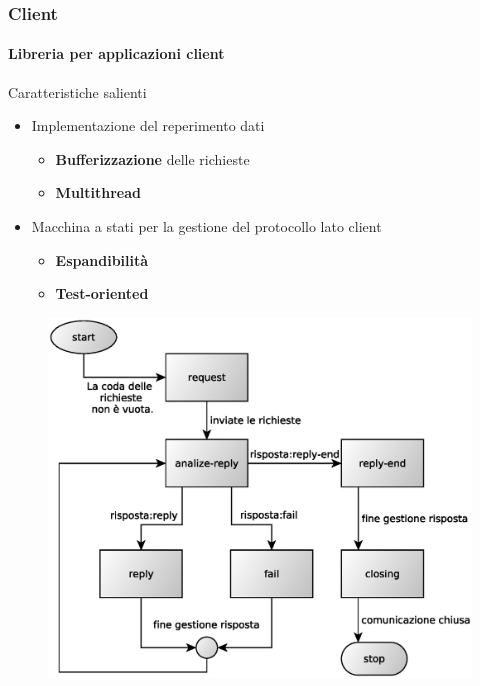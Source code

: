\documentclass[ignorenonframetext,8pt]{beamer}
\begin{document}
	\begin{frame}
		\frametitle{Client}
		\framesubtitle{Libreria per applicazioni client}
		\begin{block}{Caratteristiche salienti}
			\begin{minipage}[c]{.40\textwidth}
				\begin{itemize}
					\item Implementazione del reperimento dati
						\begin{itemize}
							\item \textbf{Bufferizzazione} delle richieste
							\item \textbf{Multithread}
						\end{itemize}
					\item Macchina a stati per la gestione del protocollo lato client
						\begin{itemize}
							\item \textbf{Espandibilit\`a}
							\item \textbf{Test-oriented}
						\end{itemize}
				\end{itemize}
			\end{minipage}
			\begin{minipage}[c]{.59\textwidth}
				\begin{figure}
					\includegraphics[width=\textwidth]{Immagini/StateMachineClient}
				\end{figure}
			\end{minipage}
		\end{block}
	\end{frame}
\end{document}

